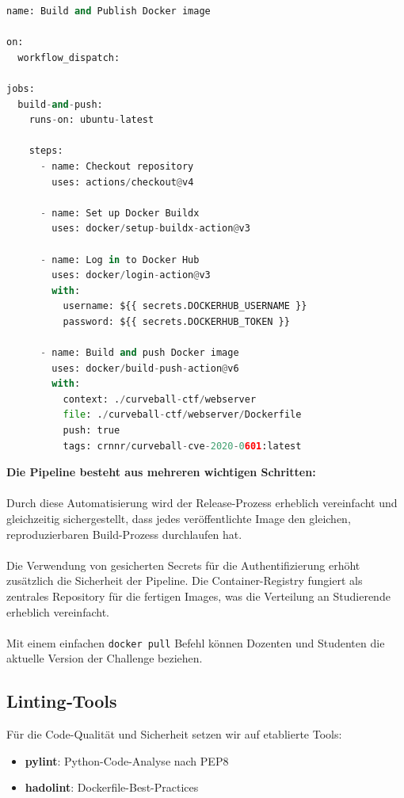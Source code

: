 \documentclass{article}
\begin{document}
\begin{lstlisting}[language=python,caption={Docker Build \& Publish Workflow}]
name: Build and Publish Docker image

on:  
  workflow_dispatch:

jobs:
  build-and-push:
    runs-on: ubuntu-latest

    steps:
      - name: Checkout repository
        uses: actions/checkout@v4

      - name: Set up Docker Buildx
        uses: docker/setup-buildx-action@v3

      - name: Log in to Docker Hub
        uses: docker/login-action@v3
        with:
          username: ${{ secrets.DOCKERHUB_USERNAME }}
          password: ${{ secrets.DOCKERHUB_TOKEN }}

      - name: Build and push Docker image
        uses: docker/build-push-action@v6
        with:
          context: ./curveball-ctf/webserver
          file: ./curveball-ctf/webserver/Dockerfile
          push: true
          tags: crnnr/curveball-cve-2020-0601:latest
\end{lstlisting}

\noindent
\textbf{Die Pipeline besteht aus mehreren wichtigen Schritten:} \\
\\
\noindent
Durch diese Automatisierung wird der Release-Prozess erheblich vereinfacht und gleichzeitig sichergestellt, dass jedes veröffentlichte Image den gleichen, reproduzierbaren Build-Prozess durchlaufen hat. \\
\\
Die Verwendung von gesicherten Secrets für die Authentifizierung erhöht zusätzlich die Sicherheit der Pipeline.
\noindent
Die Container-Registry fungiert als zentrales Repository für die fertigen Images, was die Verteilung an Studierende erheblich vereinfacht. \\ 
\\
Mit einem einfachen \texttt{docker pull} Befehl können Dozenten und Studenten die aktuelle Version der Challenge beziehen.

\newpage

\subsection{Linting‐Tools}

Für die Code-Qualität und Sicherheit setzen wir auf etablierte Tools:

\begin{itemize}
  \item \textbf{pylint}: Python-Code-Analyse nach PEP8
  \item \textbf{hadolint}: Dockerfile-Best-Practices
\end{itemize}
\end{document}
